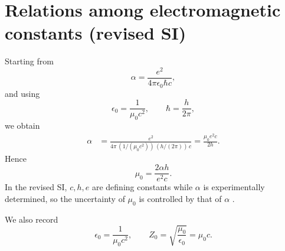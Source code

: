 \section{Relations among electromagnetic constants (revised SI)}
\label{app:em_constants}

Starting from
\begin{equation}
\alpha=\frac{e^2}{4\pi\epsilon_0\hbar c},
\end{equation}
and using
\begin{equation}
\epsilon_0=\frac{1}{\mu_0 c^2},\qquad \hbar=\frac{h}{2\pi},
\end{equation}
we obtain
\begin{align}
\alpha
&=\frac{e^2}{4\pi\,(1/(\mu_0 c^2))\,(h/(2\pi))\,c}
=\frac{\mu_0 e^2 c}{2h}.
\end{align}
Hence
\begin{equation}
\mu_0=\frac{2\alpha h}{e^2 c}.
\end{equation}
In the revised SI, $c,h,e$ are defining constants while $\alpha$ is experimentally determined, so the uncertainty of $\mu_0$ is controlled by that of $\alpha$ \cite{BIPMSI2019,NISTMu0RevisedSI,CODATA2022RMP}.

We also record
\begin{equation}
\epsilon_0=\frac{1}{\mu_0 c^2},\qquad Z_0=\sqrt{\frac{\mu_0}{\epsilon_0}}=\mu_0 c.
\end{equation}
